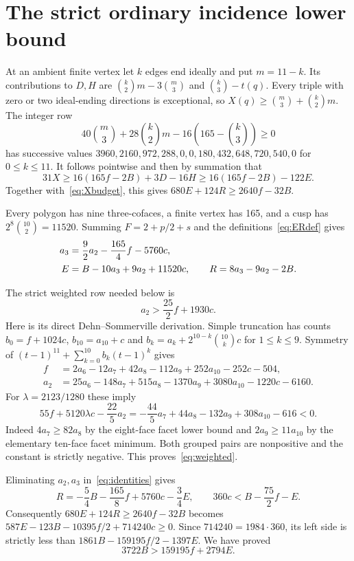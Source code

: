 \documentclass[11pt]{article}
\begin{document}
\section{The strict ordinary incidence lower bound}
At an ambient finite vertex let $k$ edges end ideally and put $m=11-k$.
Its contributions to $D,H$ are
$\binom{k}{2}m-3\binom m3$ and $\binom k3-t(q)$.
Every triple with zero or two ideal-ending directions is exceptional,
so $X(q)\ge\binom m3+\binom k2m$. The integer row
\[
 40\binom m3+28\binom k2m-16\left(165-\binom k3\right)\ge0
\]
has successive values
$3960,2160,972,288,0,0,180,432,648,720,540,0$ for $0\le k\le11$.
It follows pointwise and then by summation that
\begin{equation}\label{eq:Xlower}
 31X\ge16(165f-2B)+3D-16H
       \ge16(165f-2B)-122E.
\end{equation}
Together with~\eqref{eq:Xbudget}, this gives
$680E+124R\ge2640f-32B$.

Every polygon has nine three-cofaces, a finite vertex has 165,
and a cusp has $2^8\binom{10}{2}=11520$. Summing
$F=2+p/2+s$ and the definitions~\eqref{eq:ERdef} gives
\begin{align}
 a_3&=\frac92a_2-\frac{165}4f-5760c,\notag\\
 E&=B-10a_3+9a_2+11520c,\qquad
 R=8a_3-9a_2-2B.\label{eq:identities}
\end{align}

The strict weighted row needed below is
\begin{equation}\label{eq:weighted}
 a_2>\frac{25}2f+1930c.
\end{equation}
Here is its direct Dehn--Sommerville derivation. Simple truncation
has counts $b_0=f+1024c$, $b_{10}=a_{10}+c$ and
$b_k=a_k+2^{10-k}\binom{10}{k}c$ for $1\le k\le9$.
Symmetry of
$(t-1)^{11}+\sum_{k=0}^{10}b_k(t-1)^k$ gives
\begin{align*}
 f&=2a_6-12a_7+42a_8-112a_9+252a_{10}-252c-504,\\
 a_2&=25a_6-148a_7+515a_8-1370a_9+3080a_{10}-1220c-6160.
\end{align*}
For $\lambda=2123/1280$ these imply
\[
 55f+5120\lambda c-\frac{22}5a_2
 =-\frac{44}5a_7+44a_8-132a_9+308a_{10}-616<0.
\]
Indeed $4a_7\ge82a_8$ by the eight-face facet lower bound and
$2a_9\ge11a_{10}$ by the elementary ten-face facet minimum.
Both grouped pairs are nonpositive and the constant is strictly
negative. This proves~\eqref{eq:weighted}.

Eliminating $a_2,a_3$ in~\eqref{eq:identities} gives
\[
 R=-\frac54B-\frac{165}8f+5760c-\frac34E,\qquad
 360c<B-\frac{75}2f-E.
\]
Consequently $680E+124R\ge2640f-32B$ becomes
$587E-123B-10395f/2+714240c\ge0$.
Since $714240=1984\cdot360$, its left side is strictly less than
$1861B-159195f/2-1397E$. We have proved
\begin{equation}\label{eq:lower}
 \boxed{3722B>159195f+2794E.}
\end{equation}
\end{document}
